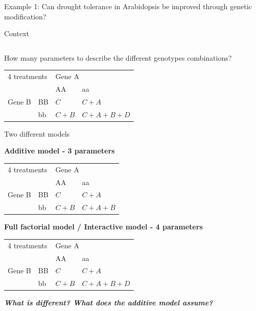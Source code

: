 \documentclass[10pt]{beamer}
\begin{document}
\begin{frame}{Example 1: Can drought tolerance in Arabidopsis be improved through genetic modification?}
\begin{block}{Context}
\begin{columns}
\begin{column}{0.2\textwidth}
   \end{column}

   \end{columns}
   
\end{block}
How many parameters to describe the different genotypes combinations?
        
\pause

\begin{center}
\begin{tabular}{|l | l | l | l | }
\toprule
  \multicolumn{2}{|l|}{4 treatments} & \multicolumn{2}{l|}{Gene A}\\
  \cmidrule(lr){3-4}
  \multicolumn{2}{|l|}{}  & AA & aa\\
 	    \midrule
      Gene B & BB & $C$ & $C+A$\\
      \cmidrule(lr){3-4}
 	    & bb & $C+B$ & $C+A+B+D$\\
	    \bottomrule
  \end{tabular}
\end{center}
 
\end{frame}

\begin{frame}{Two different models}

\textbf{Additive model - 3 parameters}
\begin{center}
\begin{tabular}{|l | l | l | l | }
\toprule
  \multicolumn{2}{|l|}{4 treatments} & \multicolumn{2}{l|}{Gene A}\\
  \cmidrule(lr){3-4}
  \multicolumn{2}{|l|}{}  & AA & aa\\
 	    \midrule
      Gene B & BB & $C$ & $C+A$\\
      \cmidrule(lr){3-4}
 	    & bb & $C+B$ & $C+A+B$\\
	    \bottomrule
  \end{tabular}
\end{center}
 

\textbf{Full factorial model / Interactive model  - 4 parameters }
\begin{center}
\begin{tabular}{|l | l | l | l | }
\toprule
  \multicolumn{2}{|l|}{4 treatments} & \multicolumn{2}{l|}{Gene A}\\
  \cmidrule(lr){3-4}
  \multicolumn{2}{|l|}{}  & AA & aa\\
 	    \midrule
      Gene B & BB & $C$ & $C+A$\\
      \cmidrule(lr){3-4}
 	    & bb & $C+B$ & $C+A+B+D$\\
	    \bottomrule
  \end{tabular}
\end{center}
 

 \textbf{\emph{What is different? What does the additive model assume?}}
\end{frame}
\end{document}
